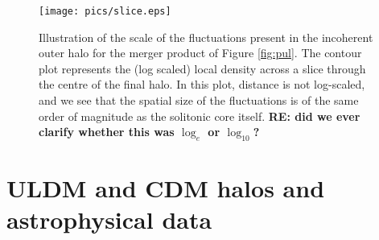 \documentclass[a4paper,11pt]{article}
\newcommand{\re}[1]{{{\bf \color{green} RE: #1}}}
\begin{document}
\begin{figure}
\centering
\texttt{[image: pics/slice.eps]}
\caption{Illustration of the scale of the fluctuations present in the incoherent outer halo for the merger product of Figure \ref{fig:pul}. The contour plot represents the (log scaled) local density across a slice through the centre of the final halo. In this plot, distance is not log-scaled, and we see that the spatial size of the fluctuations is of the same order of magnitude as the solitonic core itself. \re{did we ever clarify whether this was $\log_e$ or $\log_{10}$?}}\label{fig:contour}
\end{figure}


% 

\section{ULDM and CDM halos and astrophysical data}\label{sec:velocity}
\end{document}
